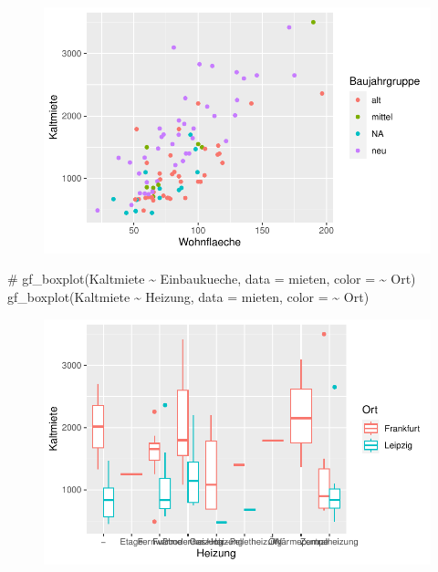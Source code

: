 \documentclass[
  a4paper,
  DIV=11]{scrartcl}
\newenvironment{Shaded}{\begin{snugshade}}{\end{snugshade}}
\newcommand{\AttributeTok}[1]{\textcolor[rgb]{0.40,0.45,0.13}{#1}}
\newcommand{\CommentTok}[1]{\textcolor[rgb]{0.37,0.37,0.37}{#1}}
\newcommand{\FunctionTok}[1]{\textcolor[rgb]{0.28,0.35,0.67}{#1}}
\newcommand{\NormalTok}[1]{\textcolor[rgb]{0.00,0.23,0.31}{#1}}
\newcommand{\SpecialCharTok}[1]{\textcolor[rgb]{0.37,0.37,0.37}{#1}}
\begin{document}
\begin{figure}[H]

{\centering \includegraphics{Mietmodellierung_files/figure-pdf/unnamed-chunk-11-2.pdf}

}

\end{figure}

\begin{Shaded}
\begin{Highlighting}[]
\CommentTok{\# gf\_boxplot(Kaltmiete \textasciitilde{} Einbaukueche, data = mieten, color = \textasciitilde{} Ort)}
\FunctionTok{gf\_boxplot}\NormalTok{(Kaltmiete }\SpecialCharTok{\textasciitilde{}}\NormalTok{ Heizung, }\AttributeTok{data =}\NormalTok{ mieten, }\AttributeTok{color =} \SpecialCharTok{\textasciitilde{}}\NormalTok{ Ort)}
\end{Highlighting}
\end{Shaded}

\begin{figure}[H]

{\centering \includegraphics{Mietmodellierung_files/figure-pdf/unnamed-chunk-11-3.pdf}

}

\end{figure}
\end{document}
